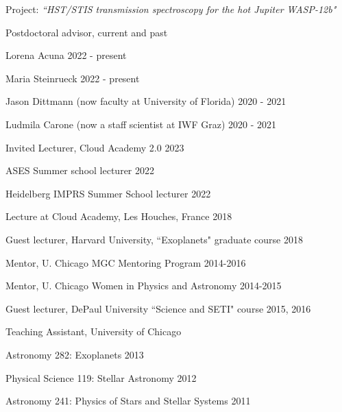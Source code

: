 \documentclass[12pt,letterpaper]{article}
\begin{document}
\begin{compactitem}[]
\begin{compactitem}
		\begin{sloppypar}
		Project: \textit{``HST/STIS transmission spectroscopy for the hot Jupiter WASP-12b"}
		\end{sloppypar}
	\end{compactitem}
\item Postdoctoral advisor, current and past
    \begin{compactitem}
    \item {Lorena Acuna \hfill 2022 - present}
    \item {Maria Steinrueck \hfill 2022 - present} 
    \item {Jason Dittmann (now faculty at University of Florida) \hfill 2020 - 2021}
    \item {Ludmila Carone (now a staff scientist at IWF Graz) \hfill 2020 - 2021}
    \end{compactitem}
\item Invited Lecturer, Cloud Academy 2.0 \hfill 2023
\item ASES Summer school lecturer \hfill 2022
\item Heidelberg IMPRS Summer School lecturer \hfill 2022
\item Lecture at Cloud Academy, Les Houches, France \hfill 2018
\item Guest lecturer, Harvard University, ``Exoplanets" graduate course \hfill 2018
\item Mentor, U. Chicago MGC Mentoring Program \hfill 2014-2016 
\item Mentor, U. Chicago Women in Physics and Astronomy \hfill2014-2015
\item Guest lecturer, DePaul University ``Science and SETI" course \hfill2015, 2016
\item Teaching Assistant, University of Chicago
	\begin{compactitem}
	\item Astronomy 282:  Exoplanets \hfill 2013
	\item Physical Science 119:  Stellar Astronomy	\hfill 2012
	\item Astronomy 241:  Physics of Stars and Stellar Systems \hfill	2011 
	\end{compactitem}
\end{compactitem}
\end{document}
